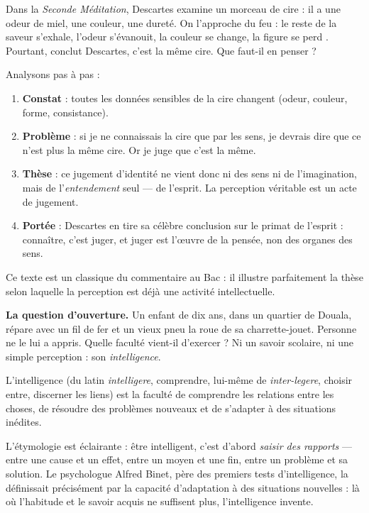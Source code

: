 \documentclass[11pt]{article}
\newcommand{\cle}[1]{{\popxbold\color{popdark}#1}}
\newcounter{popsec}
\newcounter{popsub}
\newcommand{\courssub}[1]{%
  \stepcounter{popsub}%
  \par\vspace{9pt}\noindent{\popxbold\fontsize{11.5}{13}\selectfont\color{popink}{\color{poporange}\thepopsec.\thepopsub}\hspace{6pt}#1}\par\nopagebreak\vspace{4pt}
}
\begin{document}
\begin{experience}
Dans la \emph{Seconde Méditation}, Descartes examine un morceau de cire : il a une odeur de miel, une couleur, une dureté. On l'approche du feu : \guillemotleft le reste de la saveur s'exhale, l'odeur s'évanouit, la couleur se change, la figure se perd \guillemotright. Pourtant, conclut Descartes, c'est la même cire. Que faut-il en penser ?

Analysons pas à pas :
\begin{enumerate}
\item \textbf{Constat} : toutes les données sensibles de la cire changent (odeur, couleur, forme, consistance).
\item \textbf{Problème} : si je ne connaissais la cire que par les sens, je devrais dire que ce n'est plus la même cire. Or je juge que c'est la même.
\item \textbf{Thèse} : ce jugement d'identité ne vient donc ni des sens ni de l'imagination, mais de l'\emph{entendement} seul — de l'esprit. La perception véritable est un acte de \cle{jugement}.
\item \textbf{Portée} : Descartes en tire sa célèbre conclusion sur le primat de l'esprit : connaître, c'est juger, et juger est l'œuvre de la pensée, non des organes des sens.
\end{enumerate}
Ce texte est un classique du commentaire au Bac : il illustre parfaitement la thèse selon laquelle la perception est déjà une activité intellectuelle.
\end{experience}

\courssub{L'intelligence : comprendre et s'adapter}

\textbf{La question d'ouverture.} Un enfant de dix ans, dans un quartier de Douala, répare avec un fil de fer et un vieux pneu la roue de sa charrette-jouet. Personne ne le lui a appris. Quelle faculté vient-il d'exercer ? Ni un savoir scolaire, ni une simple perception : son \emph{intelligence}.

\begin{definition}[L'intelligence]
L'\cle{intelligence} (du latin \emph{intelligere}, comprendre, lui-même de \emph{inter-legere}, choisir entre, discerner les liens) est la faculté de comprendre les relations entre les choses, de résoudre des problèmes nouveaux et de s'adapter à des situations inédites.
\end{definition}

L'étymologie est éclairante : être intelligent, c'est d'abord \emph{saisir des rapports} — entre une cause et un effet, entre un moyen et une fin, entre un problème et sa solution. Le psychologue Alfred Binet, père des premiers tests d'intelligence, la définissait précisément par la capacité d'adaptation à des situations nouvelles : là où l'habitude et le savoir acquis ne suffisent plus, l'intelligence invente.
\end{document}
